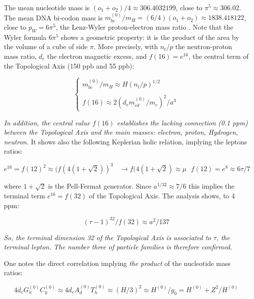 \documentclass[a4paper,9pt]{article}
\newcounter{row}
\begin{document}
The mean nucleotide mass is $ (o_1 + o_2)/4 \approx 306.4032199$, close to $\pi^5 \approx 306.02$. The mean DNA bi-codon mass is $m_{bc}^{(0)}/m_H = (6/4)(o_1 + o_2) \approx 1838.418122$, close to $p_W = 6 \pi^5$, the Lenz-Wyler proton-electron mass ratio \cite{Wyler}. Note that the Wyler formula $6\pi^5$ shows a geometric property: it is the product of the area by the volume of a cube of side $\pi$. More precisely, with $n_t/p$ the neutron-proton mass ratio,  $d_e$ the electron magnetic excess, and $f(16)= e^{16}$, the central term of the Topological Axis (150 ppb and 55 ppb):
 
 \begin{equation}\label{Eq17}
 \left\{
    \begin{array}{ll}
       m_{bc}^{(0)}/m_H \approx H(n_t/p)^{1/2} \\
       \\
f(16) \approx 2(d_em_{cd}^{(0)}/m_e)^2 /a^3  
    \end{array}
\right.
\end{equation}

\textit{In addition, the central value $f(16)$ establishes the lacking connection (0.1 ppm) between the Topological Axis and the main masses: electron, proton, Hydrogen, neutron.}
It shows also the following Keplerian holic relation, implying the leptons ratios: 

\begin{equation}\label{Eq18}
e^{16} = f(12)^2 \approx (f(4(1+\sqrt 2))^3 ~~~~ \rightarrow  f(4(1+\sqrt 2) \approx \mu ~~~ f(12) = e^8 \approx 6\tau/7
 \end{equation}

where $1+\sqrt 2$ is the Pell-Fermat generator. Since $a^{1/32}\approx 7/6$ this implies the terminal term $e^{16} = f(32)$ of the Topological Axis. The analysis shows, to 4 ppm:

\begin{equation}\label{Eq19}
(\tau -1)^{32}/f(32) \approx a^2/137
 \end{equation}

\textit{So, the terminal dimension 32 of the Topological Axis is associated to $\tau$, the terminal lepton. The number three of particle families is therefore confirmed.}

One notes the direct correlation implying \textit{the product} of the nucleotide mass ratios:

\begin{equation}\label{Eq20}
4d_e G_u^{(0)} C_y^{(0)} \approx 4d_e A_d^{(0)} T_h^{(0)} \approx (H/3)^2 \approx H^{(0)}/g_0 = H^{(0)} + Z^2/H^{(0)}
 \end{equation}
 
\end{document}
